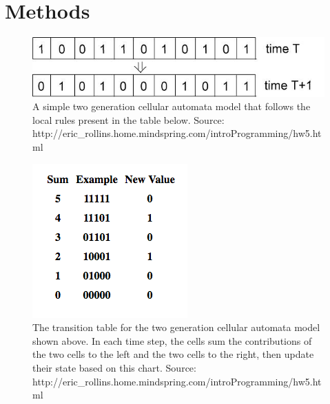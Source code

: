\documentclass{article}
\begin{document}
\section*{Methods}
\begin{figure} [htbp] \centering
 \includegraphics[scale=0.70]{figures/SimpleCA_2Gen.jpg}
 \caption{A simple two generation cellular automata model that follows the local rules present in the table below. Source: http://eric\_rollins.home.mindspring.com/introProgramming/hw5.html}
\end{figure}

\begin{figure} [htbp] \centering
 \includegraphics[scale=0.80]{figures/SimpleCA_TransTable}
 \caption{The transition table for the two generation cellular automata model shown above. In each time step, the cells sum the contributions of the two cells to the left and the two cells to the right, then update their state based on this chart. Source: http://eric\_rollins.home.mindspring.com/introProgramming/hw5.html}
\end{figure}
\end{document}

